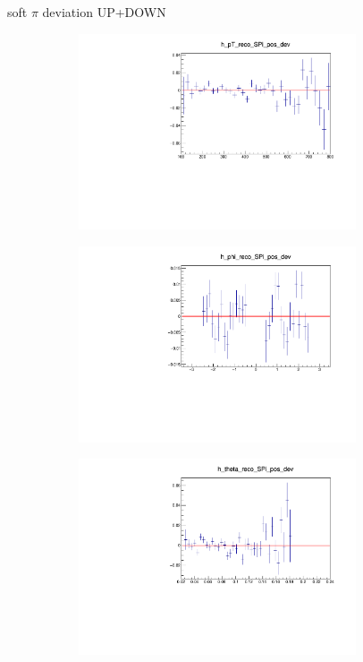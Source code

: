 \documentclass[11pt]{beamer}
\begin{document}
\begin{frame}{soft $\pi$ deviation UP+DOWN}
\begin{figure}
\begin{subfigure}{0.45\textwidth}
\includegraphics[width=0.9\textwidth]{first/up_plus_down_pdf/pT_2.pdf}
\end{subfigure}
\begin{subfigure}{0.45\textwidth}
\includegraphics[width=0.9\textwidth]{first/up_plus_down_pdf/phi_2.pdf}
\end{subfigure}
\begin{subfigure}{0.45\textwidth}
\includegraphics[width=0.9\textwidth]{first/up_plus_down_pdf/theta_2.pdf}

\end{subfigure}
\end{figure}
\end{frame}
\end{document}
